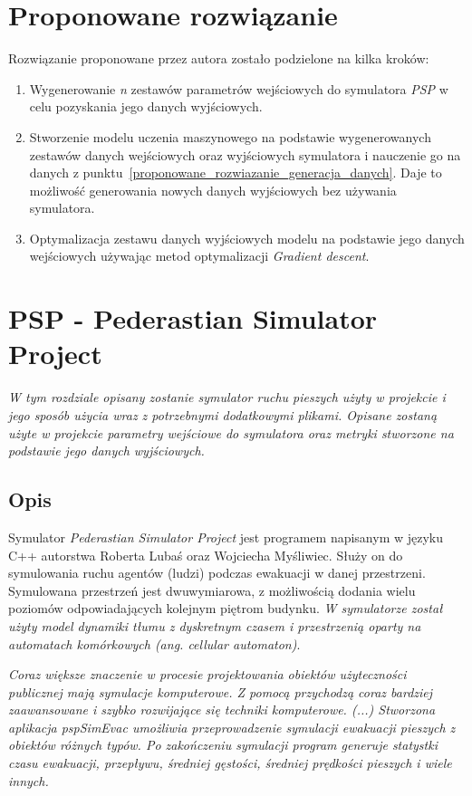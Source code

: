 \documentclass[12pt]{aghdpl}
\begin{document}
	\chapter{Proponowane rozwiązanie}
	Rozwiązanie proponowane przez autora zostało podzielone na kilka kroków:
	\begin{enumerate}
	\item\label{proponowane_rozwiazanie_generacja_danych} Wygenerowanie \textit{n} zestawów parametrów wejściowych do symulatora \textit{PSP} w celu pozyskania jego danych wyjściowych.
	\item Stworzenie modelu uczenia maszynowego na podstawie wygenerowanych zestawów danych wejściowych oraz wyjściowych symulatora i nauczenie go na danych z punktu~\ref{proponowane_rozwiazanie_generacja_danych}. Daje to możliwość generowania nowych danych wyjściowych bez używania symulatora.
	\item Optymalizacja zestawu danych wyjściowych modelu na podstawie jego danych wejściowych używając metod optymalizacji \textit{Gradient descent}.
	\end{enumerate}
	
	\chapter{PSP - Pederastian Simulator Project} \label{sekcja_psp}
	\textit{W tym rozdziale opisany zostanie symulator ruchu pieszych użyty w projekcie i jego sposób użycia wraz z potrzebnymi dodatkowymi plikami. Opisane zostaną użyte w projekcie parametry wejściowe do symulatora oraz metryki stworzone na podstawie jego danych wyjściowych.}
	
		\section{Opis}
		Symulator \textit{Pederastian Simulator Project} jest programem napisanym w języku C++ autorstwa Roberta Lubaś oraz Wojciecha Myśliwiec. Służy on do symulowania ruchu agentów (ludzi) podczas ewakuacji w danej przestrzeni. Symulowana przestrzeń jest dwuwymiarowa, z możliwością dodania wielu poziomów odpowiadających kolejnym piętrom budynku. \textit{W symulatorze został użyty model dynamiki tłumu z dyskretnym czasem i przestrzenią oparty na automatach komórkowych (ang. cellular automaton)}. \cite{Lubas2016}

		\textit{Coraz większe znaczenie w procesie projektowania obiektów użyteczności publicznej mają symulacje komputerowe. Z pomocą przychodzą coraz bardziej zaawansowane i szybko rozwijające się techniki komputerowe. (...) Stworzona aplikacja pspSimEvac umożliwia przeprowadzenie symulacji ewakuacji pieszych z obiektów różnych typów. Po zakończeniu symulacji program generuje statystki czasu ewakuacji, przepływu, średniej gęstości, średniej prędkości pieszych i wiele innych.}\cite{modelowanie_ewakuacji_pieszych}
		
\end{document}
